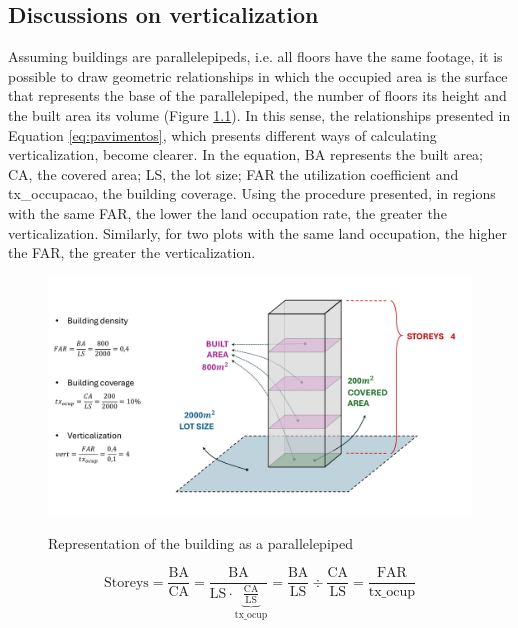 \begin{apendicesenv}

    \partapendices
    
    \chapter{Discussions on verticalization}
    \label{appendix:verticalization}
    
    Assuming buildings are parallelepipeds, i.e. all floors have the same footage, it is possible to draw geometric relationships in which the occupied area is the surface that represents the base of the parallelepiped, the number of floors its height and the built area its volume (Figure \ref{fig:desenho}). In this sense, the relationships presented in Equation \ref{eq:pavimentos}, which presents different ways of calculating verticalization, become clearer. In the equation, BA represents the built area; CA, the covered area; LS, the lot size; FAR the utilization coefficient and tx\_occupacao, the building coverage. Using the procedure presented, in regions with the same FAR, the lower the land occupation rate, the greater the verticalization. Similarly, for two plots with the same land occupation, the higher the FAR, the greater the verticalization.
    
    \begin{figure}[h]
        \centering
        \caption{Representation of the building as a parallelepiped}
        \includegraphics[width = \linewidth]{figuras/desenho.pdf}
        \label{fig:desenho}
    \end{figure}
    
    \begin{equation}
        \text{Storeys}=\frac{\text{BA}}{\text{CA}}=\frac{\text{BA}}{\text{LS}\cdot\underbrace{\frac{\text{CA}}{\text{LS}}}_\text{tx\_ocup}}=\frac{\text{BA}}{\text{LS}}\div\frac{\text{CA}}{\text{LS}}=\frac{\text{FAR}}{\text{tx\_ocup}}
        \label{eq:pavimentos}
    \end{equation}
        

\end{apendicesenv}
